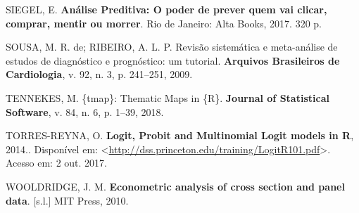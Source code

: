 \documentclass[12pt,brazil,oneside]{book}
\begin{document}
\leavevmode\hypertarget{ref-Siegel2017}{}%
SIEGEL, E. \textbf{Análise Preditiva: O poder de prever quem vai clicar, comprar, mentir ou morrer}. Rio de Janeiro: Alta Books, 2017. 320 p.

\leavevmode\hypertarget{ref-Sousa2009}{}%
SOUSA, M. R. de; RIBEIRO, A. L. P. Revisão sistemática e meta-análise de estudos de diagnóstico e prognóstico: um tutorial. \textbf{Arquivos Brasileiros de Cardiologia}, v. 92, n. 3, p. 241--251, 2009.

\leavevmode\hypertarget{ref-tmap}{}%
TENNEKES, M. \{tmap\}: Thematic Maps in \{R\}. \textbf{Journal of Statistical Software}, v. 84, n. 6, p. 1--39, 2018.

\leavevmode\hypertarget{ref-Torres-Reyna2014}{}%
TORRES-REYNA, O. \textbf{Logit, Probit and Multinomial Logit models in R}, 2014.. Disponível em: \textless{}\url{http://dss.princeton.edu/training/LogitR101.pdf}\textgreater{}. Acesso em: 2 out. 2017.

\leavevmode\hypertarget{ref-wooldridge2010}{}%
WOOLDRIDGE, J. M. \textbf{Econometric analysis of cross section and panel data}. {[}s.l.{]} MIT Press, 2010.
\end{document}
